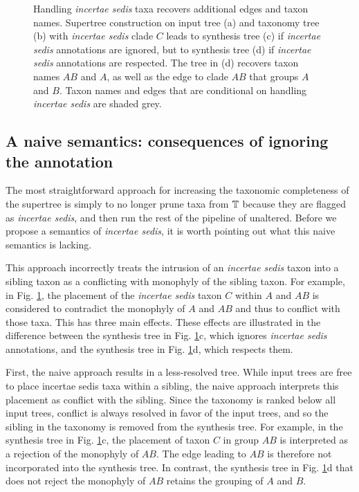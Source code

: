 \documentclass[english]{article}
\begin{document}
\begin{figure}
{}

\caption{\label{fig:Handling-incertae-sedis}Handling \emph{incertae sedis
}taxa recovers additional edges and taxon names.
Supertree construction on input tree (a) and taxonomy tree (b) with \emph{incertae sedis}
clade $C$ leads to synthesis tree (c) if \emph{incertae sedis} annotations are
ignored, but to synthesis tree (d) if \emph{incertae sedis} annotations are respected.
The tree in (d) recovers taxon names $AB$ and $A$, as well as the edge to clade $AB$
that groups $A$ and $B$. Taxon names and edges that are conditional on handling
\emph{incertae sedis}
are shaded grey.
}

\end{figure}

\subsection{A naive semantics: consequences of ignoring the annotation}

The most straightforward approach for increasing the taxonomic completeness of
the supertree is simply to no longer prune taxa from $\mbox{\ensuremath{\mathbb{T}}}$ because they are flagged
as \emph{incertae sedis}, and then run the rest of the pipeline of
\citet{redelings2017supertree} unaltered.  Before we propose a semantics of
\emph{incertae sedis}, it is worth pointing out what this naive semantics is lacking.

This approach incorrectly treats the intrusion of an \emph{incertae sedis} taxon
into a sibling taxon as a conflicting with monophyly of the sibling taxon. For
example, in Fig. \ref{fig:Handling-incertae-sedis}, the placement of the
\emph{incertae sedis} taxon $C$ within $A$ and $AB$ is considered
to contradict the monophyly of $A$ and $AB$ and thus to conflict with those taxa.
This has three main effects.  These effects are illustrated in the difference
between the synthesis tree in Fig. \ref{fig:Handling-incertae-sedis}c, which
ignores \emph{incertae sedis} annotations, and the synthesis tree in Fig.
\ref{fig:Handling-incertae-sedis}d, which respects them.

First, the naive approach results in a less-resolved tree.  While input trees are
free to place incertae sedis taxa within a sibling, the naive approach
interprets this placement as conflict with the sibling.  Since the taxonomy
is ranked below all input trees, conflict is always resolved in favor of the
input trees, and so the sibling in the taxonomy is removed from the synthesis
tree.  For example, in the synthesis tree in Fig.
\ref{fig:Handling-incertae-sedis}c, the placement of taxon $C$ in group $AB$ is
interpreted as a rejection of the monophyly of $AB$. The edge leading to $AB$ is
therefore not incorporated into the synthesis tree.  In contrast, the synthesis
tree in Fig. \ref{fig:Handling-incertae-sedis}d that does not reject the
monophyly of $AB$ retains the grouping of $A$ and $B$.
\end{document}

